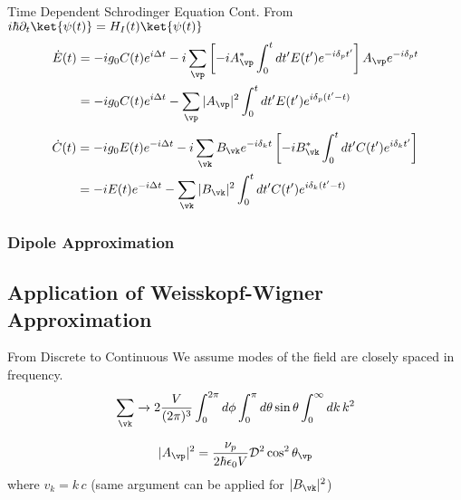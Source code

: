 \begin{frame}{Time Dependent Schrodinger Equation Cont.}
 From $i \hbar \partial_t \ket{\psi (t)} = H_I(t) \ket{\psi (t) }$
 \begin{align}
 \notag
     \Dot{E}(t) &= -i g_0 C(t) e^{i \Delta t} -i \sum_{\vp}\left[ -i A^{*}_{\vp} \int_0^t dt' E(t')  e^{-i\delta_p t'}\right ] A_{\vp} e^{-i\delta_p t}\\
     &=-i g_0 C(t) e^{i \Delta t} - \sum_{\vp} |A_{\vp}|^2 \int_0^t dt' E(t')  e^{i\delta_p (t'-t)} \label{eq:E_dot_raw}
 \end{align}
 \begin{align}
 \notag
     \Dot{C}(t) &= -i g_0 E(t) e^{-i \Delta t} -i \sum_{\vk} B_{\vk} e^{-i\delta_k t} \left [  -i B^{*}_{\vk} \int_0^t dt' C(t') e^{i \delta_{k} t'} \right] \\
     &= -i E(t) e^{-i \Delta t} - \sum_{\vk} |B_{\vk}|^2  \int_0^t dt' C(t') e^{i \delta_{k}( t'-t)}\label{eq:C_dot_raw}
 \end{align}
     

\end{frame}
\subsubsection{Dipole Approximation }
\subsection{Application of Weisskopf-Wigner Approximation}
\begin{frame}{From Discrete to Continuous}
    We assume modes of the field are closely spaced in frequency. 
    \begin{equation}
        \sum_{\vk} \xrightarrow[]{} 2 \frac{V}{(2 \pi)^{3}} \int_0^{2\pi} d \phi \int_0^\pi d\theta \sin \theta  \int_0^\infty dk \, k^2
    \end{equation}
    
    \begin{equation}
        |A_{\vp}|^2 = \frac{\nu_p}{2\hbar \epsilon_0 V} \mathcal{D}^2 \cos^2\theta_{\vp} \label{eq:free_coupling}
    \end{equation} where $v_k = k\,c$ \newline
    (same argument can be applied for $|B_{\vk}|^2 $)
\end{frame}

